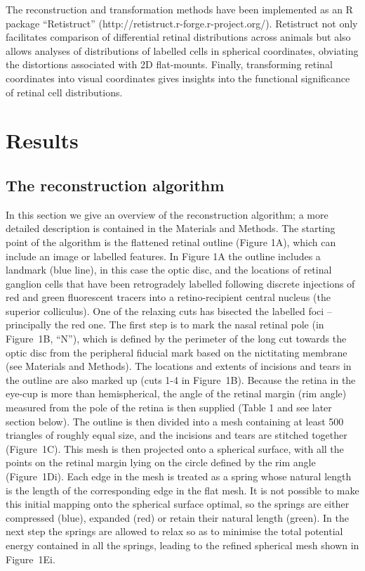 \documentclass[10pt]{article}
\newcounter{Figure}
\begin{document}
The reconstruction and transformation methods have been implemented as
an R package ``Retistruct''
(http://retistruct.r-forge.r-project.org/). Retistruct not only
facilitates comparison of differential retinal distributions across
animals but also allows analyses of distributions of labelled cells
in spherical coordinates, obviating the distortions associated with
2D flat-mounts. Finally, transforming retinal coordinates into visual
coordinates gives insights into the functional significance of
retinal cell distributions.  

\section*{Results}
\subsection*{The reconstruction algorithm}
In this section we give an overview of the reconstruction algorithm; a
more detailed description is contained in the Materials and Methods.
The starting point of the algorithm is the flattened retinal outline
(Figure 1A), which can include an image or labelled features. In
Figure 1A the outline includes a landmark (blue line), in this case
the optic disc, and the locations of retinal ganglion cells that have
been retrogradely labelled following discrete injections of red and
green fluorescent tracers into a  retino-recipient central nucleus
(the superior colliculus). One of the relaxing cuts has bisected the
labelled foci -- principally the red one. The first step is to mark
the nasal retinal pole (in Figure~1B, ``N''), which is defined by the
perimeter of the long cut towards the optic disc from the peripheral
fiducial mark based on the nictitating membrane (see Materials and
Methods). The locations and extents of incisions and tears in the
outline are also marked up (cuts 1-4 in Figure~1B). Because the
retina in the eye-cup is more than hemispherical, the angle of the
retinal margin (rim angle) measured from the pole of the retina is
then supplied (Table 1 and see later section below). The outline is
then divided into a mesh containing at least 500 triangles of roughly
equal size, and the incisions and tears are stitched together
(Figure~1C). This mesh is then projected onto a spherical surface,
with all the points on the retinal margin lying on the circle defined
by the rim angle (Figure~1Di). Each edge in the mesh is treated as a
spring whose natural length is the length of the corresponding edge
in the flat mesh. It is not possible to make this initial mapping
onto the spherical surface optimal, so the springs are either
compressed (blue), expanded (red) or retain their natural length
(green). In the next step the springs are allowed to relax so as to
minimise the total potential energy contained in all the springs,
leading to the refined spherical mesh shown in Figure~1Ei. 
\end{document}

